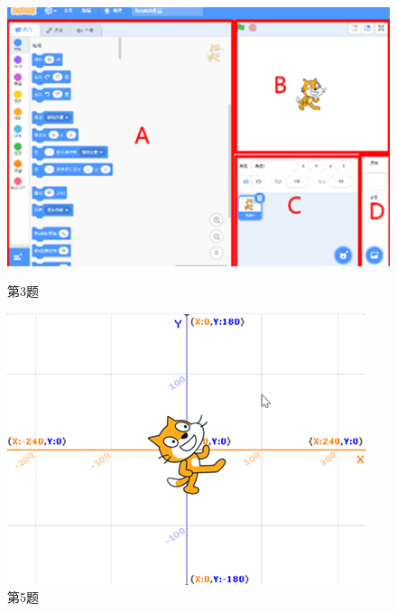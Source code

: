 \documentclass[10.5pt, a4paper]{article}
\begin{document}
\begin{enumerate}
        \begin{figure}[htbp]
            \centering
            \begin{minipage}[t]{.2\textwidth}
                \centering
                \includegraphics[width=1\textwidth]{3.png}
                \caption*{第3题}
            \end{minipage}
            \begin{minipage}[t]{.18\textwidth}
                \centering
                \includegraphics[width=\textwidth]{5.png}
                \caption*{第5题}
            \end{minipage}
            \begin{minipage}[t]{.2\textwidth}
                \centering

\end{minipage}
\end{figure}
\end{enumerate}
\end{document}
